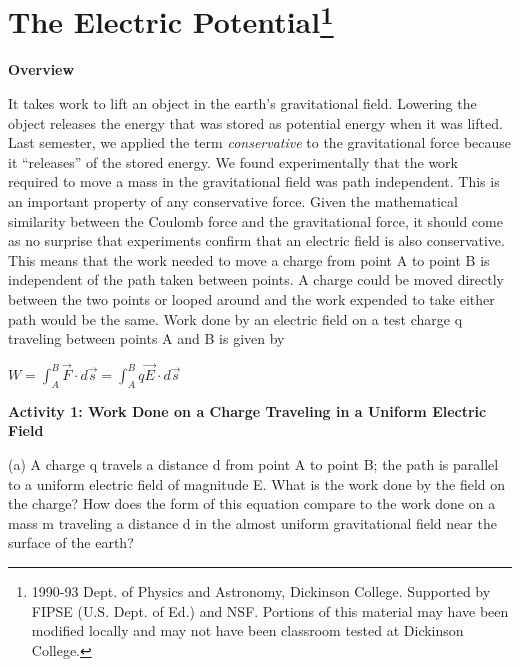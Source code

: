 
\section{The Electric Potential\footnote{%
1990-93 Dept. of Physics and Astronomy, Dickinson College. Supported
by FIPSE (U.S. Dept. of Ed.) and NSF. Portions of this material may
have been modified locally and may not have been classroom tested
at Dickinson College.
}}

\makelabheader %

\textbf{Overview}

It takes work to lift an object in the earth's gravitational field.
Lowering the object releases the energy that was stored as potential
energy when it was lifted. Last semester, we applied the term \emph{conservative}
to the gravitational force because it {}``releases'' 
of the stored energy. We found experimentally that the work required
to move a mass in the gravitational field was path independent. This
is an important property of any conservative force. Given the mathematical
similarity between the Coulomb force and the gravitational force,
it should come as no surprise that experiments confirm that an electric
field is also conservative. This means that the work needed to move
a charge from point A to point B is independent of the path taken
between points. A charge could be moved directly between the two points
or looped around and the work expended to take either path would be
the same. Work done by an electric field on a test charge q traveling
between points A and B is given by

{\centering \( W=\int ^{B}_{A} \)\( \overrightarrow{F}\cdot d\overrightarrow{s}=\int ^{B}_{A}q\overrightarrow{E}\cdot d\overrightarrow{s} \)\par}

\textbf{Activity 1: Work Done on a Charge Traveling in a Uniform Electric
Field}

(a) A charge q travels a distance d from point A to point B; the path
is parallel to a uniform electric field of magnitude E. What is the
work done by the field on the charge? How does the form of this equation
compare to the work done on a mass m traveling a distance d in the
almost uniform gravitational field near the surface of the earth?

